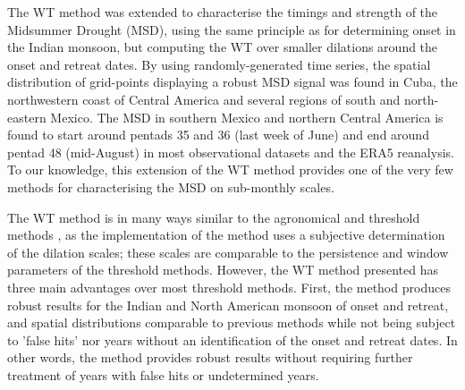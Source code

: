 The WT method was extended to characterise the timings and strength of the Midsummer Drought (MSD), using the same principle as for determining onset in the Indian monsoon, but computing the WT over smaller dilations around the onset and retreat dates.  By using randomly-generated time series, the spatial distribution of grid-points displaying a robust MSD signal was found in Cuba, the northwestern coast of Central America and several regions of south and north-eastern Mexico.  The MSD in southern Mexico and northern Central America is found to start around pentads 35 and 36 (last week of June) and end around pentad 48 (mid-August) in most observational datasets and the ERA5 reanalysis. To our knowledge, this extension of the WT method provides one of the very few methods for characterising the MSD on sub-monthly scales.





The WT method is in many ways similar to the agronomical and threshold methods \citep[e.g.][]{liebmann2001interannual,moron2014interannual}, as the implementation of the method uses a subjective determination of the dilation scales; these scales are comparable to the persistence and window parameters of the threshold methods. However, the WT method presented has three main advantages over most threshold methods. First, the method produces robust results for the Indian and North American monsoon of onset and retreat, and spatial distributions comparable to previous methods \citep{moron2014interannual} while not being subject to 'false hits' nor years without an identification of the onset and retreat dates. In other words, the method provides robust results without requiring further treatment of years with false hits or undetermined years. 

